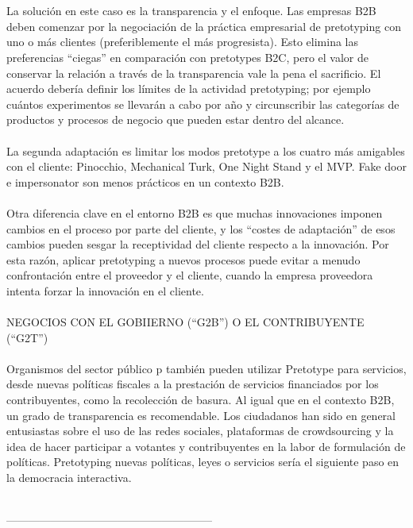 \documentclass{article}
\begin{document}
\\ \\
La soluci\'on en este caso es la transparencia y el enfoque. Las empresas B2B deben comenzar por la negociaci\'on de la pr\'actica empresarial de pretotyping con uno o m\'as clientes (preferiblemente el  m\'as progresista). Esto elimina las preferencias ``ciegas'' en comparaci\'on con pretotypes B2C, pero el valor de conservar la  relaci\'on a trav\'es de la transparencia vale la pena el sacrificio. El acuerdo deber\'ia definir los l\'imites de la actividad pretotyping; por ejemplo cu\'antos experimentos se llevar\'an a cabo por a\~no y circunscribir las categor\'ias de productos y procesos de negocio que pueden estar dentro del alcance.
\\ \\
La segunda adaptaci\'on es limitar los modos pretotype a los cuatro m\'as amigables con el cliente: Pinocchio, Mechanical Turk, One Night Stand y el MVP.
Fake door e impersonator son menos pr\'acticos en un contexto B2B.
\\ \\
Otra diferencia clave en el entorno B2B es que muchas innovaciones imponen cambios en el proceso por parte del cliente, y los ``costes de adaptaci\'on'' de esos cambios pueden sesgar la receptividad del cliente respecto a la innovaci\'on. Por esta raz\'on, aplicar pretotyping a nuevos procesos puede evitar a menudo confrontaci\'on entre el proveedor y el cliente, cuando la empresa proveedora intenta forzar la innovaci\'on en el cliente.
\\ \\
NEGOCIOS CON EL GOBIIERNO (``G2B'') O EL CONTRIBUYENTE (``G2T'')
\\ \\
Organismos del sector p\'ublico p tambi\'en pueden utilizar Pretotype para servicios, desde nuevas pol\'iticas fiscales a la prestaci\'on de servicios financiados por los contribuyentes, como la recolecci\'on de basura. Al igual que en el contexto B2B, un grado de transparencia es recomendable. Los ciudadanos han sido en general entusiastas sobre el uso de las redes sociales, plataformas de crowdsourcing y la idea de hacer participar a votantes y contribuyentes en la labor de formulaci\'on de pol\'iticas. Pretotyping nuevas pol\'iticas, leyes o servicios ser\'ia el siguiente paso en la democracia interactiva.
\\ \\

\centerline{--------------------------------------------------------}
\end{document}
